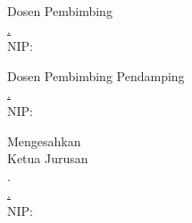   \begin{minipage}[t]{0.40\textwidth}
    Dosen Pembimbing\\[2em]
    \underline{\dotwidth\adddot}\\[-0.1cm]
    NIP: {\dotwidth} 
  \end{minipage}
  \hfill
  \begin{minipage}[t]{0.40\textwidth}
    Dosen Pembimbing Pendamping\\[2em]
    \underline{\dotwidth\adddot}\\[-0.1cm]
    NIP: {\dotwidth}\\[0.5cm]
  \end{minipage}

   Mengesahkan\\
   Ketua Jurusan\\
   {\dotwidth\adddot}\\[2em]
   \underline{\dotwidth\adddot}\\[-0.1cm]
   NIP: {\dotwidth}
\ec
